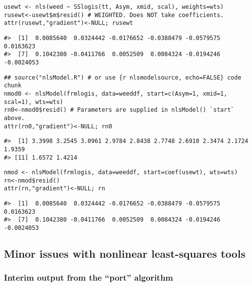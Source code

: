 \begin{verbatim}
usewt <- nls(weed ~ SSlogis(tt, Asym, xmid, scal), weights=wts)
rusewt<-usewt$m$resid() # WEIGHTED. Does NOT take coefficients.
attr(rusewt,"gradient")<-NULL; rusewt
\end{verbatim}

\begin{verbatim}
#>  [1]  0.0085640  0.0324442 -0.0176652 -0.0388479 -0.0579575  0.0163623
#>  [7]  0.1042380 -0.0411766  0.0052509  0.0084324 -0.0194246 -0.0024053
\end{verbatim}

\begin{verbatim}
## source("nlsModel.R") # or use {r nlsmodelsource, echo=FALSE} code chunk
nmod0 <- nlsModel(frmlogis, data=weeddf, start=c(Asym=1, xmid=1, scal=1), wts=wts)
rn0<-nmod0$resid() # Parameters are supplied in nlsModel() `start` above.
attr(rn0,"gradient")<-NULL; rn0
\end{verbatim}

\begin{verbatim}
#>  [1] 3.3998 3.2545 3.0961 2.9784 2.8438 2.7748 2.6910 2.3474 2.1724 1.9359
#> [11] 1.6572 1.4214
\end{verbatim}

\begin{verbatim}
nmod <- nlsModel(frmlogis, data=weeddf, start=coef(usewt), wts=wts)
rn<-nmod$resid()
attr(rn,"gradient")<-NULL; rn
\end{verbatim}

\begin{verbatim}
#>  [1]  0.0085640  0.0324442 -0.0176652 -0.0388479 -0.0579575  0.0163623
#>  [7]  0.1042380 -0.0411766  0.0052509  0.0084324 -0.0194246 -0.0024053
\end{verbatim}

\hypertarget{minor-issues-with-nonlinear-least-squares-tools}{%
\subsection{Minor issues with nonlinear least-squares tools}\label{minor-issues-with-nonlinear-least-squares-tools}}

\hypertarget{interim-output-from-the-port-algorithm}{%
\subsubsection{Interim output from the ``port'' algorithm}\label{interim-output-from-the-port-algorithm}}

